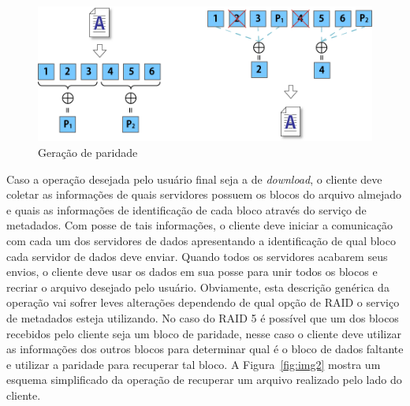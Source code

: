 \begin{figure}[htb]
	\begin{center}
		
		\includegraphics[clip,width=15.0cm]{images/image6.png}
		\caption{Geração de paridade}
		\label{fig:img6}
	\end{center}
\end{figure}

Caso a operação desejada pelo usuário final seja a de \textit{download}, o cliente deve coletar as informações de quais servidores possuem os blocos do arquivo almejado e quais as informações de identificação de cada bloco através do serviço de metadados. Com posse de tais informações, o cliente deve iniciar a comunicação com cada um dos servidores de dados apresentando a identificação de qual bloco cada servidor de dados deve enviar. Quando todos os servidores acabarem seus envios, o cliente deve usar os dados em sua posse para unir todos os blocos e recriar o arquivo desejado pelo usuário. Obviamente, esta descrição genérica da operação vai sofrer leves alterações dependendo de qual opção de RAID o serviço de metadados esteja utilizando. No caso do RAID 5 é possível que um dos blocos recebidos pelo cliente seja um bloco de paridade, nesse caso o cliente deve utilizar as informações dos outros blocos para determinar qual é o bloco de dados faltante e utilizar a paridade para recuperar tal bloco. A Figura~\ref{fig:img2} mostra um esquema simplificado da operação de recuperar um arquivo realizado pelo lado do cliente.
\\

